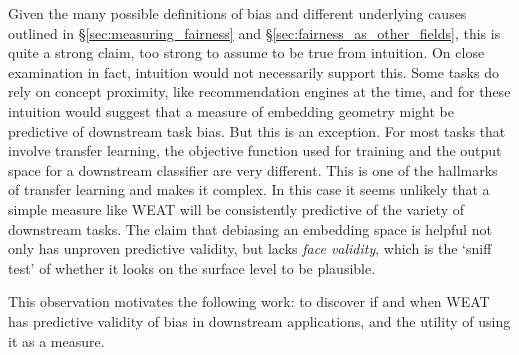 Given the many possible definitions of bias and different underlying causes outlined in \S \ref{sec:measuring_fairness} and \S \ref{sec:fairness_as_other_fields}, this is quite a strong claim, too strong to assume to be true from intuition. On close examination in fact, intuition would not necessarily support this. Some tasks do rely on concept proximity, like recommendation engines at the time, and for these intuition would suggest that a measure of embedding geometry might be predictive of downstream task bias. But this is an exception. For most tasks that involve transfer learning, the objective function used for training and the output space for a downstream classifier are very different. This is one of the hallmarks of transfer learning and makes it complex. In this case it seems unlikely that a simple measure like WEAT will be consistently predictive of the variety of downstream tasks.
The claim that debiasing an embedding space is helpful not only has unproven predictive validity, but lacks \textit{face validity}, which is the `sniff test' of whether it looks on the surface level to be plausible.  

This observation motivates the following work: to discover if and when WEAT has predictive validity of bias in downstream applications, and the utility of using it as a measure.  